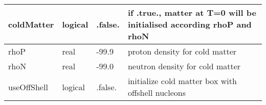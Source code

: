 \documentclass{article}
\begin{document}
\begin{longtable}{llll}
\midrule
coldMatter & \begin{minipage}[t]{2cm}logical\end{minipage} & \begin{minipage}[t]{2cm}.false.\end{minipage} & \begin{minipage}[t]{12cm}if .true., matter at T=0 will be initialised according rhoP and rhoN\end{minipage}\\*
\midrule
rhoP & \begin{minipage}[t]{2cm}real\end{minipage} & \begin{minipage}[t]{2cm}-99.9\end{minipage} & \begin{minipage}[t]{12cm}proton density for cold matter\end{minipage}\\*
\midrule
rhoN & \begin{minipage}[t]{2cm}real\end{minipage} & \begin{minipage}[t]{2cm}-99.0\end{minipage} & \begin{minipage}[t]{12cm}neutron density for cold matter\end{minipage}\\*
\midrule
useOffShell & \begin{minipage}[t]{2cm}logical\end{minipage} & \begin{minipage}[t]{2cm}.false.\end{minipage} & \begin{minipage}[t]{12cm}initialize cold matter box with offshell nucleons\end{minipage}\\*
\bottomrule
\end{longtable}
{ }



\end{document}
